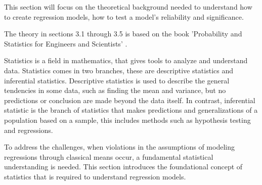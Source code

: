 This section will focus on the theoretical background needed to understand how to create regression models, how to test a model's reliability and significance.

\noindent The theory in sections 3.1 through 3.5 is based on the book 'Probability and Statistics for Engineers and Scientists' \cite{ProbAndStat}. \newline

\noindent Statistics is a field in mathematics, that gives tools to analyze and understand data. Statistics comes in two branches, these are descriptive statistics and inferential statistics. Descriptive statistics is used to describe the general tendencies in some data, such as finding the mean and variance, but no predictions or conclusion are made beyond the data itself. In contrast, inferential statistic is the branch of statistics that makes predictions and generalizations of a population based on a sample, this includes methods such as hypothesis testing and regressions. 

\noindent To address the challenges, when violations in the assumptions of modeling regressions through classical means occur, a fundamental statistical understanding is needed. This section introduces the foundational concept of statistics that is required to understand regression models.






\newpage

